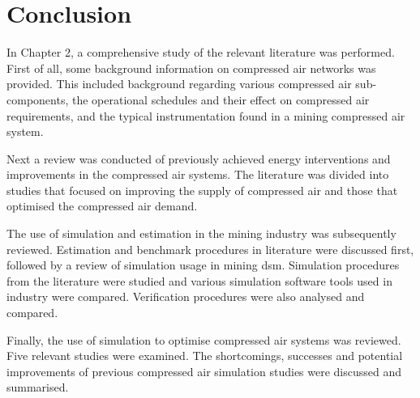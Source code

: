 \section{Conclusion}
In Chapter 2, a comprehensive study of the relevant literature was performed. First of all, some background information on compressed air networks was provided. This included background regarding various compressed air sub-components, the operational schedules and their effect on compressed air requirements, and the typical instrumentation found in a mining compressed air system.
\par
Next a review was conducted of previously achieved energy interventions and improvements in the compressed air systems. The literature was divided into studies that focused on improving the supply of compressed air and those that optimised the compressed air demand.
\par
The use of simulation and estimation in the mining industry was subsequently reviewed. Estimation and benchmark procedures in literature were discussed first, followed by a review of simulation usage in mining \gls{dsm}. Simulation procedures from the literature were studied and various simulation software tools used in industry were compared. Verification procedures were also analysed and compared.
\par 
	Finally, the use of simulation to optimise compressed air systems was reviewed.  Five relevant studies were examined. The shortcomings, successes and potential improvements of previous compressed air simulation studies were discussed and summarised.